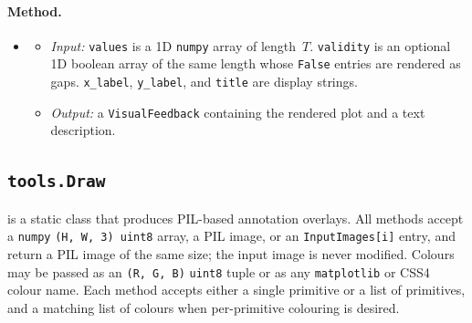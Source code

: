 \paragraph{Method.}
\begin{itemize}[leftmargin=1.5em]
\item {}
  \begin{itemize}
  \item \emph{Input:} \texttt{values} is a 1D \texttt{numpy} array of length~$T$. \texttt{validity} is an optional 1D boolean array of the same length whose \texttt{False} entries are rendered as gaps. \texttt{x\_label}, \texttt{y\_label}, and \texttt{title} are display strings.
  \item \emph{Output:} a \texttt{VisualFeedback} containing the rendered plot and a text description.
  \end{itemize}
\end{itemize}

\subsection{\texttt{tools.Draw}}
\label{app:tool_draw}
 is a static class that produces PIL-based annotation overlays. All methods accept a \texttt{numpy} \texttt{(H, W, 3) uint8} array, a PIL image, or an \texttt{InputImages[i]} entry, and return a PIL image of the same size; the input image is never modified. Colours may be passed as an \texttt{(R, G, B)} \texttt{uint8} tuple or as any \texttt{matplotlib} or CSS4 colour name. Each method accepts either a single primitive or a list of primitives, and a matching list of colours when per-primitive colouring is desired.

